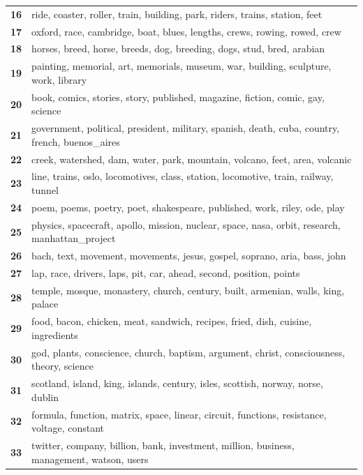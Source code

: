 \begin{table}[htpb]
\begin{tabularx}{\textwidth}{@{}l X@{}}
        \textbf{16} & ride, coaster, roller, train, building, park, riders, trains, station, feet \\
        \textbf{17} & oxford, race, cambridge, boat, blues, lengths, crews, rowing, rowed, crew \\
        \textbf{18} & horses, breed, horse, breeds, dog, breeding, dogs, stud, bred, arabian \\
        \textbf{19} & painting, memorial, art, memorials, museum, war, building, sculpture, work, library \\
        \textbf{20} & book, comics, stories, story, published, magazine, fiction, comic, gay, science \\
        \textbf{21} & government, political, president, military, spanish, death, cuba, country, french, buenos\_aires \\
        \textbf{22} & creek, watershed, dam, water, park, mountain, volcano, feet, area, volcanic \\
        \textbf{23} & line, trains, oslo, locomotives, class, station, locomotive, train, railway, tunnel \\
        \textbf{24} & poem, poems, poetry, poet, shakespeare, published, work, riley, ode, play \\
        \textbf{25} & physics, spacecraft, apollo, mission, nuclear, space, nasa, orbit, research, manhattan\_project \\
        \textbf{26} & bach, text, movement, movements, jesus, gospel, soprano, aria, bass, john \\
        \textbf{27} & lap, race, drivers, laps, pit, car, ahead, second, position, points \\
        \textbf{28} & temple, mosque, monastery, church, century, built, armenian, walls, king, palace \\
        \textbf{29} & food, bacon, chicken, meat, sandwich, recipes, fried, dish, cuisine, ingredients \\
        \textbf{30} & god, plants, conscience, church, baptism, argument, christ, consciousness, theory, science \\
        \textbf{31} & scotland, island, king, islands, century, isles, scottish, norway, norse, dublin \\
        \textbf{32} & formula, function, matrix, space, linear, circuit, functions, resistance, voltage, constant \\
        \textbf{33} & twitter, company, billion, bank, investment, million, business, management, watson, users \\

\end{tabularx}
\end{table}
